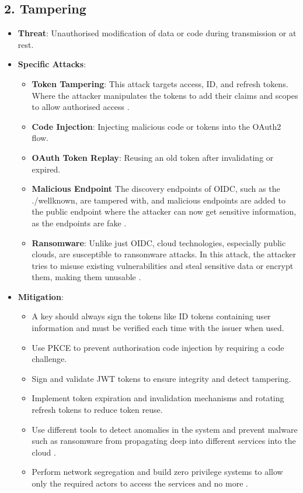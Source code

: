 \subsection*{2. Tampering}
\begin{itemize}
    \item \textbf{Threat}: Unauthorised modification of data or code during transmission or at rest.
    \item \textbf{Specific Attacks}:
    \begin{itemize}
        \item \textbf{Token Tampering}: This attack targets access, ID, and refresh tokens. Where the attacker manipulates the tokens to add their claims and scopes to allow authorised access \citep{oidc_attacks}.
        \item \textbf{Code Injection}: Injecting malicious code or tokens into the OAuth2 flow.
        \item \textbf{OAuth Token Replay}: Reusing an old token after invalidating or expired.
        \item \textbf{Malicious Endpoint} The discovery endpoints of OIDC, such as the ./wellknown, are tampered with, and malicious endpoints are added to the public endpoint where the attacker can now get sensitive information, as the endpoints are fake \citep{oidc_attacks}.
        \item \textbf{Ransomware}: Unlike just OIDC, cloud technologies, especially public clouds, are susceptible to ransomware attacks. In this attack, the attacker tries to misuse existing vulnerabilities and steal sensitive data or encrypt them, making them unusable \citep{ransomeware}.
    \end{itemize}
    \item \textbf{Mitigation}:
    \begin{itemize}
         \item A key should always sign the tokens like ID tokens containing user information and must be verified each time with the issuer when used.
        \item Use PKCE to prevent authorisation code injection by requiring a code challenge.
        \item Sign and validate JWT tokens to ensure integrity and detect tampering.
        \item Implement token expiration and invalidation mechanisms and rotating refresh tokens to reduce token reuse.
        \item Use different tools to detect anomalies in the system and prevent malware such as ransomware from propagating deep into different services into the cloud \citep{ransomeware}.
        \item Perform network segregation and build zero privilege systems to allow only the required actors to access the services and no more \citep{zero_trust}. 
    \end{itemize}
\end{itemize}

